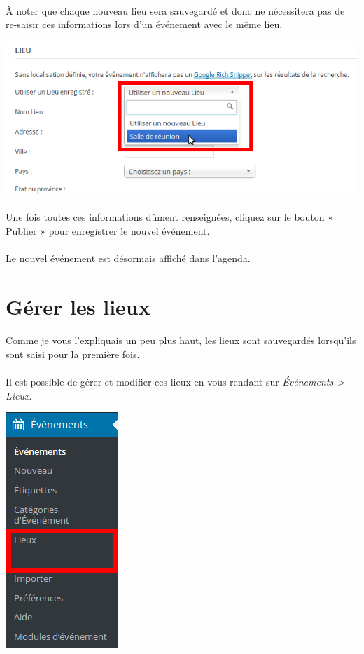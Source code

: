 \documentclass[10pt,a4paper]{article}
\begin{document}
\paragraph{}À noter que chaque nouveau lieu sera sauvegardé et donc ne nécessitera pas de re-saisir ces informations lors d'un événement avec le même lieu.
\begin{center}
\includegraphics[scale=0.3]{img/0200.png}
\end{center}
\paragraph{}Une fois toutes ces informations dûment renseignées, cliquez sur le bouton « Publier » pour enregistrer le nouvel événement.
\paragraph{}Le nouvel événement est désormais affiché dans l'agenda.
\newpage
\section{Gérer les lieux}
\paragraph{}Comme je vous l'expliquais un peu plus haut, les lieux sont sauvegardés lorsqu'ils sont saisi pour la première fois.
\paragraph{}Il est possible de gérer et modifier ces lieux en vous rendant sur \textit{Événements > Lieux}.
\begin{center}
\includegraphics[scale=0.3]{img/0202.png}
\end{center}
\end{document}
